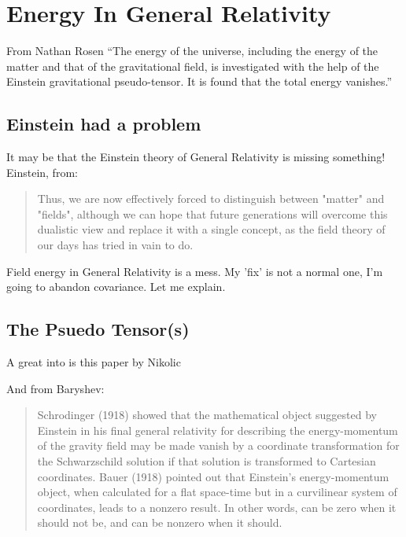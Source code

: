 \documentclass[../rzero]{subfiles}
\begin{document}
\chapter{Energy In General Relativity}\label{energyGeneralRelativityChapter}

\begin{chapquote}{From Nathan Rosen\cite{rosenEnergyUniverse1994}}
``The energy of the universe, including the energy of the matter and that of the gravitational field, is investigated with the help of the Einstein gravitational pseudo-tensor. It is found that the total energy vanishes.''
\end{chapquote}


\section{Einstein had a problem}
It may be that the Einstein theory of General Relativity is missing something! Einstein, from:\cite{08092323EnergyMomentumGravitational} 

\begin{quotation}
	Thus, we are now effectively forced to distinguish between "matter" and "fields", although we can hope that future generations will overcome this dualistic view and replace it with a single concept, as the field theory of our days has tried in vain to do. 
\end{quotation}


Field energy in General Relativity is a mess. My 'fix' is not a normal one, I'm going to abandon covariance. Let me explain.

\section{The Psuedo Tensor(s)}

A great into is this paper by Nikolic\cite{nikolicTrivialSolutionGravitational2014}



And from Baryshev\cite{08092323EnergyMomentumGravitational}:
\begin{quotation}
	Schrodinger (1918) showed that the mathematical object suggested by Einstein in his final general relativity for describing the energy-momentum of the gravity field may be made vanish by a coordinate transformation for the Schwarzschild solution if that solution is transformed to Cartesian coordinates. Bauer (1918) pointed out that Einstein's energy-momentum object, when calculated for a flat space-time but in a  curvilinear system of coordinates, leads to a nonzero result. In other words, can be zero when it should not be, and can be nonzero when it should.
\end{quotation}
\end{document}
